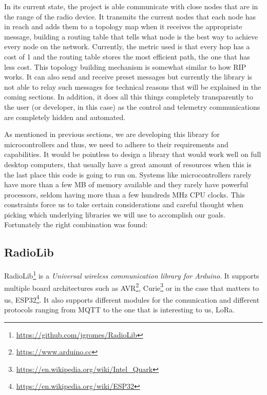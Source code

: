 In its current state, the project is able communicate with close nodes that are in the range of the radio device. It transmits the current nodes that each node has in reach and adds them to a topology map when it receives the appropriate message, building a routing table that tells what node is the best way to achieve every node on the network. Currently, the metric used is that every hop has a cost of 1 and the routing table stores the most efficient path, the one that has less cost. This topology building mechanism is somewhat similar to how RIP works. It can also send and receive preset messages but currently the library is not able to relay such messages for technical reasons that will be explained in the coming sections. %
In addition, it does all this things completely transparently to the user (or developer, in this case) as the control and telemetry communications are completely hidden and automated.

As mentioned in previous sections, we are developing this library for microcontrollers and thus, we need to adhere to their requirements and capabilities. It would be pointless to design a library that would work well on full desktop computers, that usually have a great amount of resources when this is the last place this code is going to run on. Systems like microcontrollers rarely have more than a few MB of memory available and they rarely have powerful processors, seldom having more than a few hundreds MHz CPU clocks. %
This constraints force us to take certain considerations and careful thought when picking which underlying libraries we will use to accomplish our goals. Fortunately the right combination was found:
\subsection{RadioLib}
RadioLib\footnote{\url{https://github.com/jgromes/RadioLib}} is a \textit{Universal wireless communication library for Arduino}. It supports multiple board architectures such as AVR\footnote{\url{https://www.arduino.cc}}, Curie\footnote{\url{https://en.wikipedia.org/wiki/Intel_Quark}} or in the case that matters to us, ESP32\footnote{\url{https://en.wikipedia.org/wiki/ESP32}}. It also supports different modules for the comunication and different protocols ranging from MQTT to the one that is interesting to us, LoRa.


